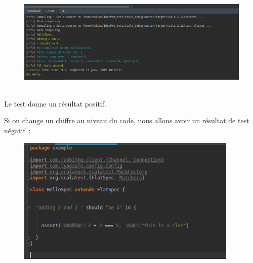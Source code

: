 \documentclass[12pt]{article}
\begin{document}

\begin{figure}[H]
	\begin{Center}
		\includegraphics[width=5.54in,height=1.96in]{./media/image19.png}
	\end{Center}
\end{figure}



\par

Le test donne un résultat positif.\par

Si on change un chiffre au niveau du code, nous allons avoir un résultat de test négatif :\par




\begin{figure}[H]
	\begin{Center}
		\includegraphics[width=4.16in,height=2.4in]{./media/image20.png}
	\end{Center}
\end{figure}


\end{document}

